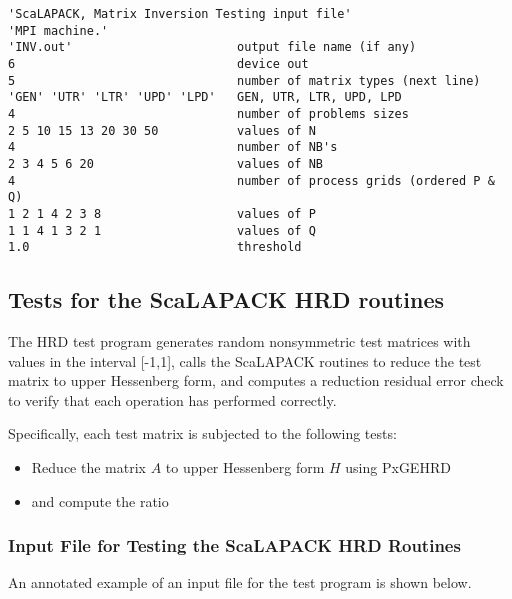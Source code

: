 \documentclass[11pt]{report}
\newcommand{\dent}{\hspace*{\parindent}}
\begin{document}
\begin{verbatim}
'ScaLAPACK, Matrix Inversion Testing input file'
'MPI machine.'
'INV.out'                       output file name (if any)
6                               device out
5                               number of matrix types (next line)
'GEN' 'UTR' 'LTR' 'UPD' 'LPD'   GEN, UTR, LTR, UPD, LPD
4                               number of problems sizes
2 5 10 15 13 20 30 50           values of N
4                               number of NB's
2 3 4 5 6 20                    values of NB
4                               number of process grids (ordered P & Q)
1 2 1 4 2 3 8                   values of P
1 1 4 1 3 2 1                   values of Q
1.0                             threshold
\end{verbatim}

\subsection{Tests for the ScaLAPACK HRD routines}

The HRD test program generates random nonsymmetric test matrices with
values in the interval [-1,1], calls the ScaLAPACK 
routines to reduce the test matrix to upper Hessenberg form, and computes
a reduction residual error check to verify that each operation has performed 
correctly.

Specifically, each test matrix is subjected to the following tests:

\begin{itemize}
\item Reduce the matrix $A$ to upper Hessenberg form $H$ using PxGEHRD
\item and compute the ratio
\end{itemize}

\subsubsection{Input File for Testing the ScaLAPACK HRD Routines}
\dent
An annotated example of an input file for the
test program is shown below.
\end{document}
